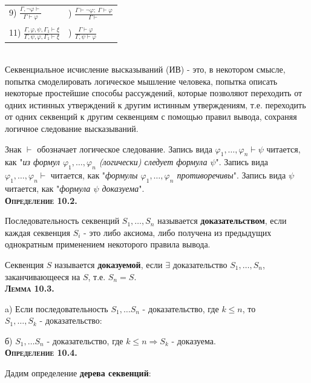 \documentclass[18pt, a4paper]{extarticle}
\newcommand{\lot}[3]{#1_#2,\dots,#1_#3}
\newcommand{\Gm}{\Gamma}
\newcommand{\vp}{\varphi}
\newcommand{\vd}{\vdash}
\begin{document}
\begin{tabular}{ll}
    9) $\displaystyle \frac{\Gm,\lnot \varphi \vdash}{\Gm\vdash\varphi}$ & \qquad
    10) $\displaystyle \frac{\Gm\vdash\lnot\varphi;\;\Gm\vdash\varphi}{\Gm\vdash}$
    \\\\
    11) $\displaystyle \frac{\Gm,\varphi,\psi,\Gm_1 \vdash \xi}{\Gm,\psi,\varphi,\Gm_1 \vdash \xi}$ & \qquad
    12) $\displaystyle \frac{\Gm\vdash\varphi}{\Gm,\psi\vdash\varphi}$
\end{tabular}\leavevmode\\

Секвенциальное исчисление высказываний (ИВ) - это, в некотором смысле, попытка смоделировать логическое мышление человека, попытка описать некоторые простейшие способы рассуждений, которые позволяют переходить от одних истинных утверждений к другим истинным утверждениям, т.е. переходить от одних секвенций к другим секвенциям с помощью правил вывода, сохраняя логичное следование высказываний.

Знак $\vd$ обозначает логическое следование. Запись вида $\lot \vp 1 n\vd\psi$ читается, как "\textit{из формул $\lot \vp 1 n$ (логически) следует формула $\psi$}"{}. Запись вида $\lot \vp 1 n\vd$ читается, как "\textit{формулы $\lot \vp 1 n$ противоречивы}"{}. Запись вида $\psi$ читается, как "\textit{формула $\psi$ доказуема}"{}.\\

\textbf{\textsc{Определение 10.2.}} 

Последовательность секвенций $S_1,\ldots,S_n$ называется \textbf{доказательством}, если каждая секвенция $S_i$ -  это либо аксиома, либо получена из предыдущих однократным применением некоторого правила вывода.

Секвенция $S$ называется \textbf{доказуемой}, если $\exists$ доказательство $S_1,\ldots,S_n$, заканчивающееся на $S$, т.е. $S_n = S$.\\

\textbf{\textsc{Лемма 10.3.}}

a) Если последовательность $S_1,\ldots S_n$ -  доказательство, где $k\leqslant n$, то\\ $S_1,\ldots,S_k$ -  доказательство:

б) $S_1,\ldots S_n$ -  доказательство, где $k\leqslant n \Rightarrow S_k$ -  доказуема.\\

\textbf{\textsc{Определение 10.4.}}

Дадим определение \textbf{дерева секвенций}:
\end{document}
